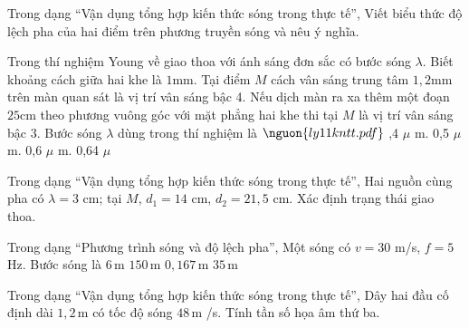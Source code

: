 \begin{ex}
Trong dạng “Vận dụng tổng hợp kiến thức sóng trong thực tế”, Viết biểu thức độ lệch pha của hai điểm trên phương truyền sóng và nêu ý nghĩa.
\choiceTF

\end{ex}

\begin{ex}
Trong thí nghiệm Young về giao thoa với ánh sáng đơn sắc có bước sóng $\lambda$. Biết khoảng cách giữa hai khe là $1 \mathrm{mm}$. Tại điểm $M$ cách vân sáng trung tâm $1,2 \mathrm{mm}$ trên màn quan sát là vị trí vân sáng bậc 4. Nếu dịch màn ra xa thêm một đoạn $25 \mathrm{cm}$ theo phương vuông góc với mặt phẳng hai khe thi tại $M$ là vị trí vân sáng bậc 3. Bước sóng $\lambda$ dùng trong thí nghiệm là $\nguon{ly11 kntt.pdf}$
\choice
{,4 $\mu$ m.}
{0,5 $\mu$ m.}
{0,6 $\mu$ m.}
{0,64 $\mu$}
\end{ex}

\begin{ex}
Trong dạng “Vận dụng tổng hợp kiến thức sóng trong thực tế”, Hai nguồn cùng pha có $\lambda=3$ cm; tại $M$, $d_1=14$ cm, $d_2=21,5$ cm. Xác định trạng thái giao thoa.
\choiceTF

\end{ex}

\begin{ex}
Trong dạng “Phương trình sóng và độ lệch pha”, Một sóng có $v=30$ m/s, $f=5$ Hz. Bước sóng là
\choice
{\True $6\,\text{m}$}
{$150\,\text{m}$}
{$0,167\,\text{m}$}
{$35\,\text{m}$}
\end{ex}

\begin{bt}
Trong dạng “Vận dụng tổng hợp kiến thức sóng trong thực tế”, Dây hai đầu cố định dài $1,2\,\text{m}$ có tốc độ sóng $48\,\text{m}$ /s. Tính tần số họa âm thứ ba.
\end{bt}

